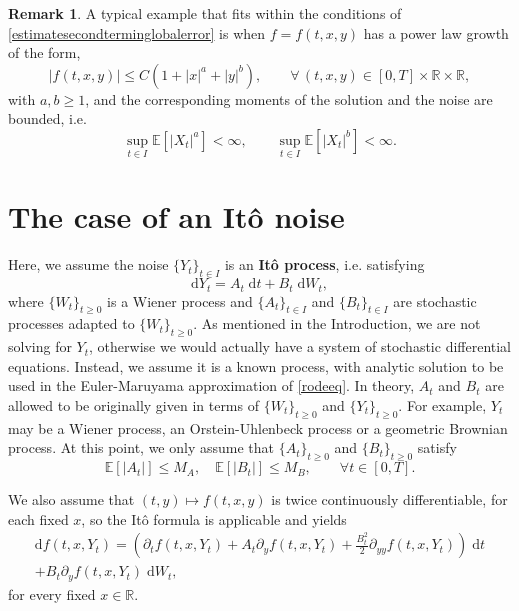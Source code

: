 \documentclass[reqno,12pt]{amsart}
\theoremstyle{plain}%
\theoremstyle{definition}
\newtheorem{rmk}{Remark}[section]
\begin{document}
\begin{rmk}
    A typical example that fits within the conditions of \cref{estimatesecondterminglobalerror} is when $f=f(t, x, y)$ has a power law growth of the form,
    \[
      |f(t, x, y)| \leq C(1 + |x|^a + |y|^b), \qquad \forall\,(t, x, y) \in [0, T] \times \mathbb{R}\times\mathbb{R},
    \]
    with $a, b \geq 1$, and the corresponding moments of the solution and the noise are bounded, i.e.
    \[
      \sup_{t\in I}\mathbb{E}[|X_t|^a]  < \infty, \qquad \sup_{t\in I}\mathbb{E}[|X_t|^b] < \infty.
    \]
\end{rmk}

\section{The case of an It\^o noise}

Here, we assume the noise $\{Y_t\}_{t\in I}$ is an \textbf{It\^o process}, i.e. satisfying
\begin{equation}
  \label{itoprocess}
  \mathrm{d}Y_t = A_t \;\mathrm{d}t + B_t \;\mathrm{d}W_t,
\end{equation}
where $\{W_t\}_{t\geq 0}$ is a Wiener process and $\{A_t\}_{t \in I}$ and $\{B_t\}_{t \in I}$ are stochastic processes adapted to $\{W_t\}_{t\geq 0}$. As mentioned in the Introduction, we are not solving for $Y_t$, otherwise we would actually have a system of stochastic differential equations. Instead, we assume it is a known process, with analytic solution to be used in the Euler-Maruyama approximation of \eqref{rodeeq}. In theory, $A_t$ and $B_t$ are allowed to be originally given in terms of $\{W_t\}_{t\geq 0}$ and $\{Y_t\}_{t\geq 0}$. For example, $Y_t$ may be a Wiener process, an Orstein-Uhlenbeck process or a geometric Brownian process. At this point, we only assume that $\{A_t\}_{t \geq 0}$ and $\{B_t\}_{t \geq 0}$ satisfy
\begin{equation}
    \label{EAtEBtbound}
    \mathbb{E}[|A_t|] \leq M_A, \quad \mathbb{E}[|B_t|] \leq M_B, \qquad \forall t \in [0, T].
\end{equation}

We also assume that $(t, y) \mapsto f(t, x, y)$ is twice continuously differentiable, for each fixed $x$, so the It\^o formula is applicable and yields
\begin{multline}
  \label{itoformula}
  \mathrm{d}f(t, x, Y_t) = \left(\partial_t f(t, x, Y_t) + A_t \partial_y f(t, x, Y_t)  + \frac{B_t^2}{2}\partial_{yy}f(t, x, Y_t) \right) \;\mathrm{d}t \\ + B_t \partial_y f(t, x, Y_t)\;\mathrm{d}W_t,
\end{multline}
for every fixed $x\in \mathbb{R}$.
\end{document}
